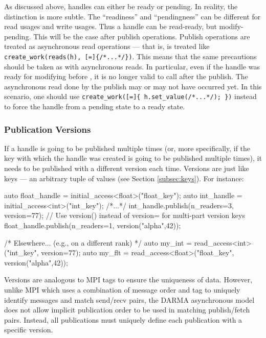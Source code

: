 As discussed above, handles can either be ready or pending. 
In reality, the distinction is more subtle. 
The ``readiness'' and ``pendingness'' can be different for read usages and write usages.
Thus a handle can be read-ready, but modify-pending.
This will be the case after publish operations.
Publish operations are treated as asynchronous read operations --- that is,
 is treated like
\verb|create_work(reads(h), [=]{/*...*/})|. 
This means that the same precautions should be taken as with asynchronous reads. 
In particular, even if the handle was ready for modifying before
, it is no longer valid to call  after the publish.
The asynchronous read done by the publish may or may not have occurred yet.  
In this scenario, one should use \verb|create_work([=]{ h.set_value(/*...*/); })| instead
to force the handle from a pending state to a ready state.

\subsubsection{Publication Versions}
If a handle is going to be published multiple times (or, more specifically, if
the key with which the handle was created is going to be published multiple
times), it needs to be published with a different version each time.  
Versions are just like keys --- an arbitrary tuple of values (see Section \ref{subsec:keys}).  
For instance:

\begin{minipage}{0.9\textwidth}
\begin{CppCode}
auto float_handle = initial_access<float>("float_key");
auto int_handle = initial_access<int>("int_key");
/*...*/
int_handle.publish(n_readers=3, version=77);
// Use version() instead of version= for multi-part version keys
float_handle.publish(n_readers=1, version("alpha",42));
\end{CppCode}
\end{minipage}

\begin{minipage}{0.9\textwidth}
\begin{CppCode}
/* Elsewhere... (e.g., on a different rank) */
auto my_int = read_access<int>("int_key", version=77);
auto my_flt = read_access<float>("float_key", version("alpha",42));
\end{CppCode}
\end{minipage}

Versions are analogous to MPI tags to ensure the uniqueness of data.
However, unlike MPI which uses a combination of message order and tag to uniquely identify messages and match send/recv pairs,
the DARMA asynchronous model does not allow implicit publication order to be used in matching publish/fetch pairs.
Instead, all publications must uniquely define each publication with a specific version.

